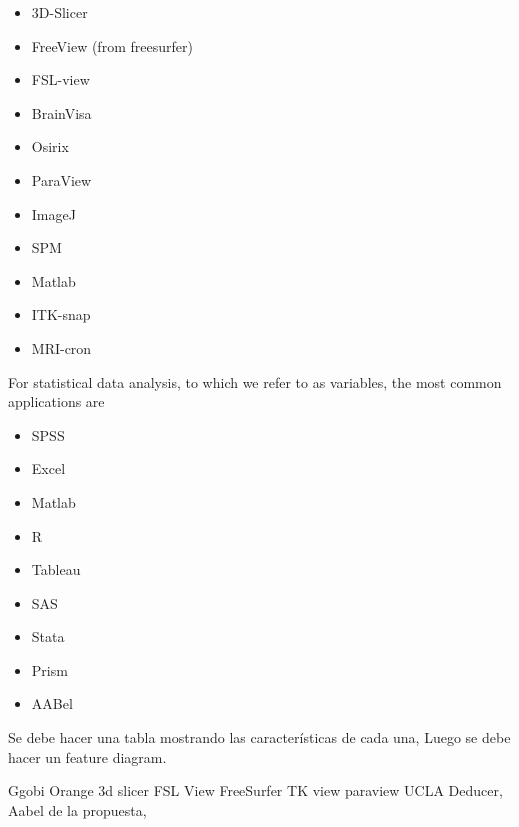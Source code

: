 \begin{itemize}
	\item 3D-Slicer
	\item FreeView (from freesurfer)
	\item FSL-view
	\item BrainVisa
	\item Osirix
	\item ParaView
	\item ImageJ
	\item SPM
	\item Matlab
	\item ITK-snap
	\item MRI-cron
\end{itemize}

For statistical data analysis, to which we refer to as variables, the most common applications are
\begin{itemize}
	\item SPSS
	\item Excel
	\item Matlab
	\item R
	\item Tableau
	\item SAS
	\item Stata
	\item Prism
	\item AABel
\end{itemize}

Se debe hacer una tabla mostrando las características de cada una,
Luego se debe hacer un feature diagram.

Ggobi
Orange
3d slicer
FSL View
FreeSurfer TK view
paraview
UCLA
Deducer, Aabel
de la propuesta, 

